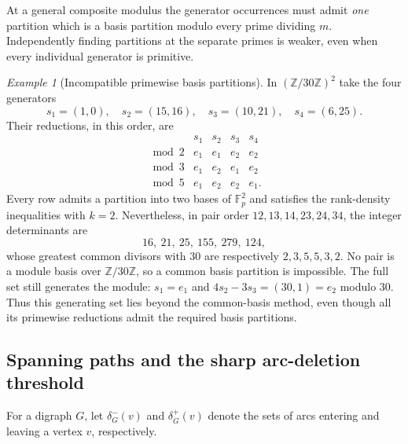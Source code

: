 \documentclass[11pt,reqno]{amsart}
\numberwithin{equation}{section}
\theoremstyle{definition}
\theoremstyle{remark}
\newtheorem{example}[theorem]{Example}
\newcommand{\Z}{\mathbb Z}
\begin{document}
At a general composite modulus the generator occurrences must admit
\emph{one} partition which is a basis partition modulo every prime
dividing $m$. Independently finding partitions at the separate primes
is weaker, even when every individual generator is primitive.

\begin{example}[Incompatible primewise basis partitions]\label{ex:crt-bases}
In $(\Z/30\Z)^2$ take the four generators
\[
 s_1=(1,0),\quad s_2=(15,16),\quad
 s_3=(10,21),\quad s_4=(6,25).
\]
Their reductions, in this order, are
\[
\begin{array}{c|cccc}
 &s_1&s_2&s_3&s_4\\\hline
\bmod 2&e_1&e_1&e_2&e_2\\
\bmod 3&e_1&e_2&e_1&e_2\\
\bmod 5&e_1&e_2&e_2&e_1.
\end{array}
\]
Every row admits a partition into two bases of $\mathbb F_p^2$ and
satisfies the rank-density inequalities with $k=2$. Nevertheless, in
pair order $12,13,14,23,24,34$, the integer determinants are
\[
 16,\ 21,\ 25,\ 155,\ 279,\ 124,
\]
whose greatest common divisors with $30$ are respectively
$2,3,5,5,3,2$. No pair is a module basis over $\Z/30\Z$, so a common
basis partition is impossible. The full set still generates the module: $s_1=e_1$ and
$4s_2-3s_3=(30,1)=e_2$ modulo $30$. Thus this generating set lies beyond the common-basis method, even
though all its primewise reductions admit the required basis partitions.
\end{example}

\subsection{Spanning paths and the sharp arc-deletion threshold}
For a digraph $G$, let $\delta_G^-(v)$ and $\delta_G^+(v)$ denote the sets of
arcs entering and leaving a vertex $v$, respectively.
\end{document}
